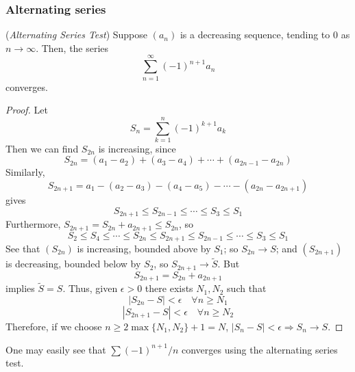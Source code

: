 \documentclass[10pt, a4paper, twoside]{report}
\begin{document}
\subsubsection{Alternating series}
\begin{theorem}
    (\emph{Alternating Series Test}) Suppose \((a_n)\) is a decreasing sequence, tending to \(0\) as \(n\to\infty\). Then, the series 
    \[\sum_{n=1}^{\infty}(-1)^{n+1}a_n\]
    converges.
    \label{thm:alter_test}
\end{theorem}
\begin{proof}
    Let
    \[S_n=\sum_{k=1}^{n}(-1)^{k+1}a_k\]
    Then we can find \(S_{2n}\) is increasing, since
    \[S_{2n}=(a_1-a_2)+(a_3-a_4)+\cdots+(a_{2n-1}-a_{2n})\]
    Similarly,
    \[S_{2n+1}=a_1-(a_2-a_3)-(a_4-a_5)-\cdots-(a_{2n}-a_{2n+1})\]
    gives
    \[S_{2n+1}\leq S_{2n-1}\leq\cdots\leq S_3\leq S_1\]
    Furthermore,
    \(S_{2n+1}=S_{2n}+a_{2n+1}\leq S_{2n}\), so
    \[S_2\leq S_4\leq\cdots\leq S_{2n}\leq S_{2n+1}\leq S_{2n-1}\leq\cdots\leq S_3\leq S_1\]
    See that \((S_{2n})\) is increasing, bounded above by \(S_1\); so \(S_{2n}\to S\); and \((S_{2n+1})\) is decreasing, bounded below by \(S_2\), so \(S_{2n+1}\to\tilde{S}\). But
    \[S_{2n+1}=S_{2n}+a_{2n+1}\]
    implies \(\tilde{S}=S\). Thus, given \(\epsilon>0\) there exists \(N_1,N_2\) such that
    \[|S_{2n}-S|<\epsilon\quad\forall n\geq N_1\]
    \[|S_{2n+1}-S|<\epsilon\quad\forall n\geq N_2\]
    Therefore, if we choose \(n\geq 2\max\{N_1,N_2\}+1=N\), \(|S_n-S|<\epsilon\Rightarrow S_n\to S\).
\end{proof}
One may easily see that \(\sum(-1)^{n+1}/n\) converges using the alternating series test.
\end{document}
